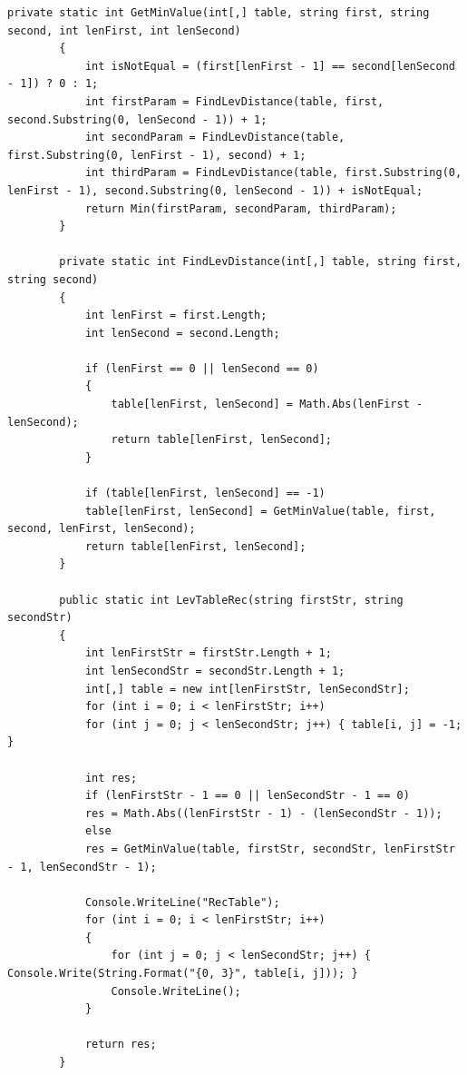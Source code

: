 \documentclass[12pt]{report}
\begin{document}
	\begin{lstlisting}[label=sone-code,caption=Функции нахождения расстояния Левенштейна рекурсивно с использованием матрицы]
		private static int GetMinValue(int[,] table, string first, string second, int lenFirst, int lenSecond)
		{
			int isNotEqual = (first[lenFirst - 1] == second[lenSecond - 1]) ? 0 : 1;
			int firstParam = FindLevDistance(table, first, second.Substring(0, lenSecond - 1)) + 1;
			int secondParam = FindLevDistance(table, first.Substring(0, lenFirst - 1), second) + 1;
			int thirdParam = FindLevDistance(table, first.Substring(0, lenFirst - 1), second.Substring(0, lenSecond - 1)) + isNotEqual;
			return Min(firstParam, secondParam, thirdParam);
		}
		
		private static int FindLevDistance(int[,] table, string first, string second)
		{
			int lenFirst = first.Length;
			int lenSecond = second.Length;
			
			if (lenFirst == 0 || lenSecond == 0)
			{
				table[lenFirst, lenSecond] = Math.Abs(lenFirst - lenSecond);
				return table[lenFirst, lenSecond];
			}
			
			if (table[lenFirst, lenSecond] == -1)
			table[lenFirst, lenSecond] = GetMinValue(table, first, second, lenFirst, lenSecond);
			return table[lenFirst, lenSecond];
		}
		
		public static int LevTableRec(string firstStr, string secondStr)
		{
			int lenFirstStr = firstStr.Length + 1;
			int lenSecondStr = secondStr.Length + 1;
			int[,] table = new int[lenFirstStr, lenSecondStr];
			for (int i = 0; i < lenFirstStr; i++)
			for (int j = 0; j < lenSecondStr; j++) { table[i, j] = -1; }
			
			int res;
			if (lenFirstStr - 1 == 0 || lenSecondStr - 1 == 0)
			res = Math.Abs((lenFirstStr - 1) - (lenSecondStr - 1));
			else
			res = GetMinValue(table, firstStr, secondStr, lenFirstStr - 1, lenSecondStr - 1);
			
			Console.WriteLine("RecTable");
			for (int i = 0; i < lenFirstStr; i++)
			{
				for (int j = 0; j < lenSecondStr; j++) { Console.Write(String.Format("{0, 3}", table[i, j])); }
				Console.WriteLine();
			}
			
			return res;
		}
	\end{lstlisting}
\end{document}
